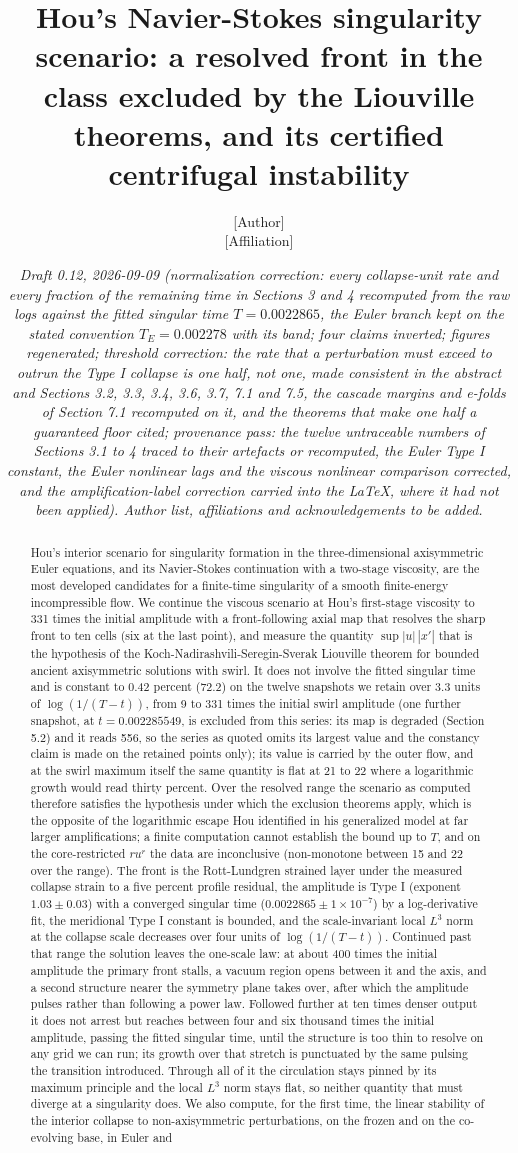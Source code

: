 \documentclass[11pt]{article}
\title{Hou's Navier-Stokes singularity scenario: a resolved front in the class excluded by the Liouville theorems, and its certified centrifugal instability}
\author{[Author]\\ {}[Affiliation]}
\date{\emph{Draft 0.12, 2026-09-09 (normalization correction: every collapse-unit rate and every fraction of the remaining time in Sections 3 and 4 recomputed from the raw logs against the fitted singular time $T = 0.0022865$, the Euler branch kept on the stated convention $T_E = 0.002278$ with its band; four claims inverted; figures regenerated; threshold correction: the rate that a perturbation must exceed to outrun the Type I collapse is one half, not one, made consistent in the abstract and Sections 3.2, 3.3, 3.4, 3.6, 3.7, 7.1 and 7.5, the cascade margins and e-folds of Section 7.1 recomputed on it, and the theorems that make one half a guaranteed floor cited; provenance pass: the twelve untraceable numbers of Sections 3.1 to 4 traced to their artefacts or recomputed, the Euler Type I constant, the Euler nonlinear lags and the viscous nonlinear comparison corrected, and the amplification-label correction carried into the LaTeX, where it had not been applied). Author list, affiliations and acknowledgements to be added.}}
\newcommand{\sn}[2]{#1\times 10^{#2}}
\begin{document}
\maketitle

\begin{abstract}
Hou's interior scenario for singularity formation in the three-dimensional axisymmetric Euler equations, and its Navier-Stokes continuation with a two-stage viscosity, are the most developed candidates for a finite-time singularity of a smooth finite-energy incompressible flow. We continue the viscous scenario at Hou's first-stage viscosity to 331 times the initial amplitude with a front-following axial map that resolves the sharp front to ten cells (six at the last point), and measure the quantity $\sup |u|\,|x'|$ that is the hypothesis of the Koch-Nadirashvili-Seregin-Sverak Liouville theorem for bounded ancient axisymmetric solutions with swirl. It does not involve the fitted singular time and is constant to 0.42 percent (72.2) on the twelve snapshots we retain over 3.3 units of $\log(1/(T - t))$, from 9 to 331 times the initial swirl amplitude (one further snapshot, at $t = 0.002285549$, is excluded from this series: its map is degraded (Section 5.2) and it reads 556, so the series as quoted omits its largest value and the constancy claim is made on the retained points only); its value is carried by the outer flow, and at the swirl maximum itself the same quantity is flat at 21 to 22 where a logarithmic growth would read thirty percent. Over the resolved range the scenario as computed therefore satisfies the hypothesis under which the exclusion theorems apply, which is the opposite of the logarithmic escape Hou identified in his generalized model at far larger amplifications; a finite computation cannot establish the bound up to $T$, and on the core-restricted $r u^r$ the data are inconclusive (non-monotone between 15 and 22 over the range). The front is the Rott-Lundgren strained layer under the measured collapse strain to a five percent profile residual, the amplitude is Type I (exponent $1.03 \pm 0.03$) with a converged singular time ($0.0022865 \pm \sn{1}{-7}$) by a log-derivative fit, the meridional Type I constant is bounded, and the scale-invariant local $L^3$ norm at the collapse scale decreases over four units of $\log(1/(T - t))$. Continued past that range the solution leaves the one-scale law: at about 400 times the initial amplitude the primary front stalls, a vacuum region opens between it and the axis, and a second structure nearer the symmetry plane takes over, after which the amplitude pulses rather than following a power law. Followed further at ten times denser output it does not arrest but reaches between four and six thousand times the initial amplitude, passing the fitted singular time, until the structure is too thin to resolve on any grid we can run; its growth over that stretch is punctuated by the same pulsing the transition introduced. Through all of it the circulation stays pinned by its maximum principle and the local $L^3$ norm stays flat, so neither quantity that must diverge at a singularity does. We also compute, for the first time, the linear stability of the interior collapse to non-axisymmetric perturbations, on the frozen and on the co-evolving base, in Euler and 
\end{abstract}
\end{document}
